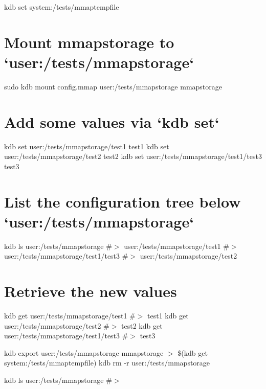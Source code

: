 kdb set system\+:/tests/mmaptempfile \hypertarget{autotoc_md417_autotoc_md430}{}\section{Mount mmapstorage to `user\+:/tests/mmapstorage`}\label{autotoc_md417_autotoc_md430}
sudo kdb mount config.\+mmap user\+:/tests/mmapstorage mmapstorage\hypertarget{autotoc_md417_autotoc_md431}{}\section{Add some values via `kdb set`}\label{autotoc_md417_autotoc_md431}
kdb set user\+:/tests/mmapstorage/test1 test1 kdb set user\+:/tests/mmapstorage/test2 test2 kdb set user\+:/tests/mmapstorage/test1/test3 test3\hypertarget{autotoc_md417_autotoc_md432}{}\section{List the configuration tree below `user\+:/tests/mmapstorage`}\label{autotoc_md417_autotoc_md432}
kdb ls user\+:/tests/mmapstorage \#$>$ user\+:/tests/mmapstorage/test1 \#$>$ user\+:/tests/mmapstorage/test1/test3 \#$>$ user\+:/tests/mmapstorage/test2\hypertarget{autotoc_md417_autotoc_md433}{}\section{Retrieve the new values}\label{autotoc_md417_autotoc_md433}
kdb get user\+:/tests/mmapstorage/test1 \#$>$ test1 kdb get user\+:/tests/mmapstorage/test2 \#$>$ test2 kdb get user\+:/tests/mmapstorage/test1/test3 \#$>$ test3

kdb export user\+:/tests/mmapstorage mmapstorage $>$ \$(kdb get system\+:/tests/mmaptempfile) kdb rm -\/r user\+:/tests/mmapstorage

kdb ls user\+:/tests/mmapstorage \#$>$

